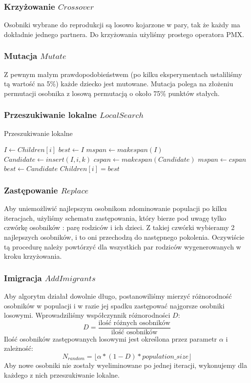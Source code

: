 \documentclass[10pt]{beamer}
\begin{document}
\frame
{
\frametitle{Krzyżowanie $Crossover$}
Osobniki wybrane do reprodukcji są losowo kojarzone w pary, tak że każdy ma dokładnie jednego partnera.
Do krzyżowania użyliśmy prostego operatora PMX.
}

\frame
{
\frametitle{Mutacja $Mutate$}
Z pewnym małym prawdopodobieństwem (po kilku eksperymentach ustaliliśmy tą wartość na 5\%) każde dziecko jest
mutowane. Mutacja polega na złożeniu permutacji osobnika z losową permutacją o około 75\% punktów stałych.
}


\frame
{
\frametitle{Przeszukiwanie lokalne $LocalSearch$}

\begin{algorithm}[H]
\caption{Przeszukiwanie lokalne}
\label{localsearch}
\begin{algorithmic}
    \State $I \gets Children[i]$
    \State $best \gets I$
    \State $mspan \gets makespan(I)$
        \State $Candidate \gets insert(I, i, k)$
        \State $cspan \gets makespan(Candidate)$
          \State $mspan \gets cspan$
          \State $best \gets Candidate$
        \EndIf
      \EndFor
    \EndFor
    \State $Children[i] = best$
  \EndFor
\end{algorithmic}
\end{algorithm}

}



\frame
{
\frametitle{Zastępowanie $Replace$}
Aby uniemożliwić najlepszym osobnikom zdominowanie populacji po kilku iteracjach, użyliśmy schematu
zastępowania, który bierze pod uwagę tylko czwórkę osobników : parę rodziców i ich dzieci. Z takiej
czwórki wybieramy 2 najlepszych osobników, i to oni przechodzą do następnego pokolenia. Oczywiście
tą procedurę należy powtórzyć dla wszystkich par rodziców wygenerowanych w kroku krzyżowania.


}



\frame
{
\frametitle{Imigracja $AddImigrants$}
Aby algorytm działał dowolnie długo, postanowiliśmy mierzyć różnorodność osobników w populacji i w razie jej
spadku zastępować najgorsze osobniki losowymi. Wprowadziliśmy współczynnik różnorodności $D$:
$$ D = \frac{\text{ilość różnych osobników}}{\text{ilość osobników}} $$
Ilość osobników zastępowanych losowymi jest określona przez parametr $\alpha$ i zależność:
$$ N_{random} = \lfloor \alpha * (1 - D) * population\_size  \rfloor $$
Aby nowe osobniki nie zostały wyeliminowane po jednej iteracji, wykonujemy dla każdego z nich przeszukiwanie
lokalne.



}
\end{document}

